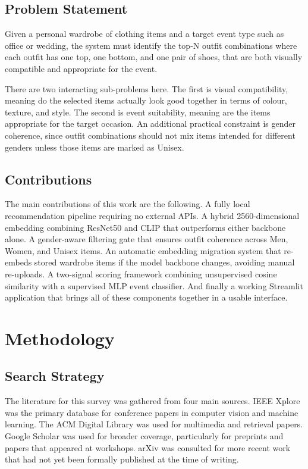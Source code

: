 \documentclass[conference]{IEEEtran}
\begin{document}
\subsection{Problem Statement}

Given a personal wardrobe of clothing items and a target event type such as office or wedding, the system must identify the top-N outfit combinations where each outfit has one top, one bottom, and one pair of shoes, that are both visually compatible and appropriate for the event.

There are two interacting sub-problems here. The first is visual compatibility, meaning do the selected items actually look good together in terms of colour, texture, and style. The second is event suitability, meaning are the items appropriate for the target occasion. An additional practical constraint is gender coherence, since outfit combinations should not mix items intended for different genders unless those items are marked as Unisex.

\subsection{Contributions}

The main contributions of this work are the following. A fully local recommendation pipeline requiring no external APIs. A hybrid 2560-dimensional embedding combining ResNet50 and CLIP that outperforms either backbone alone. A gender-aware filtering gate that ensures outfit coherence across Men, Women, and Unisex items. An automatic embedding migration system that re-embeds stored wardrobe items if the model backbone changes, avoiding manual re-uploads. A two-signal scoring framework combining unsupervised cosine similarity with a supervised MLP event classifier. And finally a working Streamlit application that brings all of these components together in a usable interface.

\section{Methodology}

\subsection{Search Strategy}

The literature for this survey was gathered from four main sources. IEEE Xplore was the primary database for conference papers in computer vision and machine learning. The ACM Digital Library was used for multimedia and retrieval papers. Google Scholar was used for broader coverage, particularly for preprints and papers that appeared at workshops. arXiv was consulted for more recent work that had not yet been formally published at the time of writing.
\end{document}
